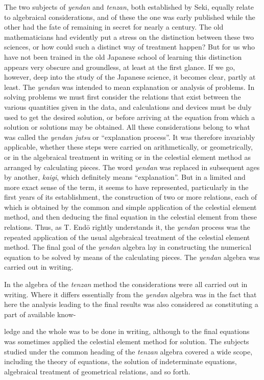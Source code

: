 \documentclass[11pt]{article}
\newcommand{\scanpage}[2]{\clearpage\setcounter{footnote}{0}\noindent{\footnotesize\color{gray}PDF page #1 · #2}\par\medskip}
\newcommand{\scanfooter}{}
\begin{document}
The two subjects of \emph{yendan} and \emph{tenzan}, both established by Seki, equally relate to algebraical considerations, and of these the one was early published while the other had the fate of remaining in secret for nearly a century. The old mathematicians had evidently put a stress on the distinction between these two sciences, or how could such a distinct way of treatment happen? But for us who have not been trained in the old Japanese school of learning this distinction appears very obscure and groundless, at least at the first glance. If we go, however, deep into the study of the Japanese science, it becomes clear, partly at least. The \emph{yendan} was intended to mean explanation or analysis of problems. In solving problems we must first consider the relations that exist between the various quantities given in the data, and calculations and devices must be duly used to get the desired solution, or before arriving at the equation from which a solution or solutions may be obtained. All these considerations belong to what was called the \emph{yendan jutsu} or ``explanation process''. It was therefore invariably applicable, whether these steps were carried on arithmetically, or geometrically, or in the algebraical treatment in writing or in the celestial element method as arranged by calculating pieces. The word \emph{yendan} was replaced in subsequent ages by another, \emph{kaigi}, which definitely means ``explanation''. But in a limited and more exact sense of the term, it seems to have represented, particularly in the first years of its establishment, the construction of two or more relations, each of which is obtained by the common and simple application of the celestial element method, and then deducing the final equation in the celestial element from these relations. Thus, as T. Endō rightly understands it, the \emph{yendan} process was the repeated application of the usual algebraical treatment of the celestial element method. The final goal of the \emph{yendan} algebra lay in constructing the numerical equation to be solved by means of the calculating pieces. The \emph{yendan} algebra was carried out in writing.

In the algebra of the \emph{tenzan} method the considerations were all carried out in writing. Where it differs essentially from the \emph{yendan} algebra was in the fact that here the analysis leading to the final results was also considered as constituting a part of available know-
\scanfooter

\scanpage{0176}{Chapter 22, printed page 162}
ledge and the whole was to be done in writing, although to the final equations was sometimes applied the celestial element method for solution. The subjects studied under the common heading of the \emph{tenzan} algebra covered a wide scope, including the theory of equations, the solution of indeterminate equations, algebraical treatment of geometrical relations, and so forth.
\end{document}

